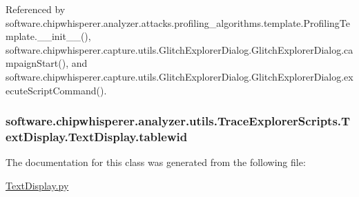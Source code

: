 Referenced by software.\+chipwhisperer.\+analyzer.\+attacks.\+profiling\+\_\+algorithms.\+template.\+Profiling\+Template.\+\_\+\+\_\+init\+\_\+\+\_\+(), software.\+chipwhisperer.\+capture.\+utils.\+Glitch\+Explorer\+Dialog.\+Glitch\+Explorer\+Dialog.\+campaign\+Start(), and software.\+chipwhisperer.\+capture.\+utils.\+Glitch\+Explorer\+Dialog.\+Glitch\+Explorer\+Dialog.\+execute\+Script\+Command().

\hypertarget{classsoftware_1_1chipwhisperer_1_1analyzer_1_1utils_1_1TraceExplorerScripts_1_1TextDisplay_1_1TextDisplay_aa90056ffb91888871d160220669fbb60}{}
\subsubsection[{tablewid}]{\setlength{\rightskip}{0pt plus 5cm}software.\+chipwhisperer.\+analyzer.\+utils.\+Trace\+Explorer\+Scripts.\+Text\+Display.\+Text\+Display.\+tablewid}\label{classsoftware_1_1chipwhisperer_1_1analyzer_1_1utils_1_1TraceExplorerScripts_1_1TextDisplay_1_1TextDisplay_aa90056ffb91888871d160220669fbb60}


The documentation for this class was generated from the following file\+:\begin{DoxyCompactItemize}
\item 
\hyperlink{TextDisplay_8py}{Text\+Display.\+py}\end{DoxyCompactItemize}
